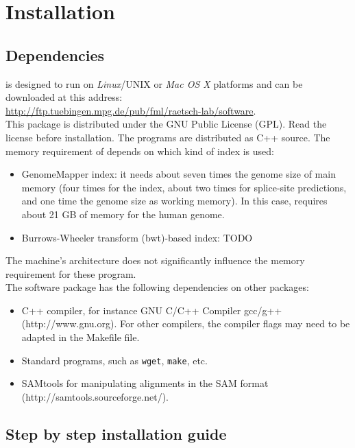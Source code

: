 \documentclass{article}
\begin{document}
\section{Installation}
\label{sec:installation}

\subsection{Dependencies}
\label{sec:dependencies}
\PALMapper{} is designed to run on \emph{Linux}/UNIX or \emph{Mac OS X} platforms and
can be downloaded at this address:\\
\url{http://ftp.tuebingen.mpg.de/pub/fml/raetsch-lab/software}.\\
This package is distributed under the GNU Public License (GPL). Read
the license before installation. The programs are distributed as C++
source. The memory requirement of \PALMapper{} depends on which kind of index is used:
\begin{itemize}
\item GenomeMapper index: it needs about seven times the genome size
  of main memory (four times for the index, about two times for
  splice-site predictions, and one time the genome size as working
  memory). In this case, \PALMapper{} requires about 21 GB of memory
  for the human genome. 
\item Burrows-Wheeler transform (bwt)-based index: TODO
\end{itemize}
The machine’s architecture does not significantly influence the memory requirement for
these program.\\

The software package has the following dependencies on other packages:
\begin{itemize}
\item C++ compiler, for instance GNU C/C++ Compiler gcc/g++
(http://www.gnu.org). For other compilers, the compiler flags may need to be
adapted in the Makefile file.
\item Standard programs, such as \texttt{wget}, \texttt{make}, etc.
\item SAMtools for manipulating alignments in the SAM format
(http://samtools.sourceforge.net/).
\end{itemize}

\subsection{Step by step installation guide}
\label{sec:installguide}
\end{document}
